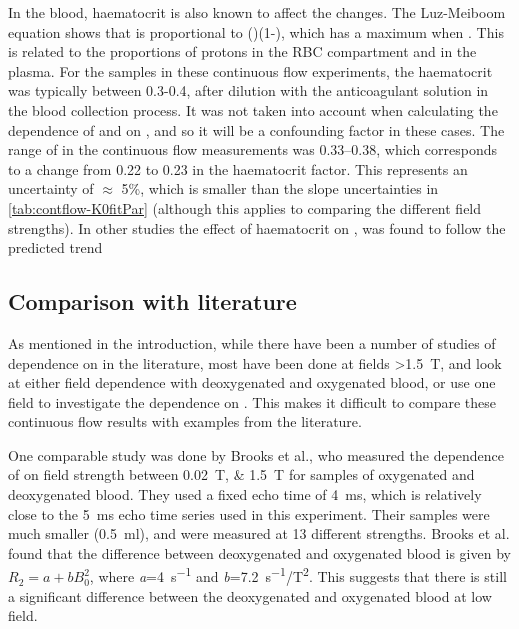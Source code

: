 In the blood, haematocrit is also known to affect the \Ttwo changes.
The Luz-Meiboom equation shows that \Kzero is proportional to (\Hct)(1-\Hct), which has a maximum when .
This is related to the proportions of protons in the RBC compartment and in the plasma.
For the samples in these continuous flow experiments, the haematocrit was typically between 0.3-0.4, after dilution with the anticoagulant solution in the blood collection process.
It was not taken into account when calculating the dependence of \Rtwo and \Kzero on \SOtwo, and so it will be a confounding factor in these cases.
The range of \Hct in the continuous flow measurements was \numrange{0.33}{0.38}, which corresponds to a change from \num{0.22} to \num{0.23} in the haematocrit factor.
This represents an uncertainty of $\approx$ 5\%, which is smaller than the slope uncertainties in \autoref{tab:contflow-K0fitPar} (although this applies to comparing the different field strengths).
In other studies the effect of haematocrit on \Ttwo, was found to follow the predicted trend \cite{GolayMeasurementtissueoxygen2001,ZhaoOxygenationhematocritdependence2007,PortnoyRelaxationpropertieshuman2017}


\subsection{Comparison with literature}
\label{sec:contflow-litcomp}
As mentioned in the introduction, while there have been a number of studies of \Ttwo dependence on \SOtwo in the literature, most have been done at fields \SI{>1.5}{T}, and look at either field dependence with deoxygenated and oxygenated blood, or use one field to investigate the dependence on \SOtwo.
This makes it difficult to compare these continuous flow results with examples from the literature.

One comparable study was done by Brooks et al., who measured the dependence of \Ttwo on field strength between \SIlist{0.02;1.5}{T} for samples of oxygenated and deoxygenated blood\cite{BrooksComparisont2relaxation1995}.
They used a fixed echo time of \SI{4}{ms}, which is relatively close to the \SI{5}{ms} echo time series used in this experiment.
Their samples were much smaller (\SI{0.5}{ml}), and were measured at 13 different \Bzero strengths.
Brooks et al. found that the difference between deoxygenated and oxygenated blood is given by $R_2 = a + bB_0^2$, where \textit{a}=\SI{4}{s^{-1}} and \textit{b}=\SI{7.2}{s^{-1}/T^2}.
This suggests that there is still a significant difference between the deoxygenated and oxygenated blood at low field.

